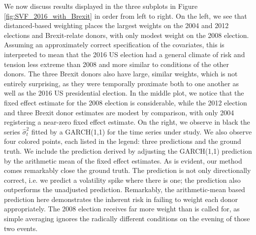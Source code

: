 \documentclass{uiucthesis2021}
\theoremstyle{definition}
\begin{document}
We now discuss results displayed in the three subplots in Figure \ref{fig:SVF_2016_with_Brexit} in order from left to right. On the left, we see that distanced-based weighting places the largest weights on the 2004 and 2012 elections and Brexit-relate donors, with only modest weight on the 2008 election. Assuming an approximately correct specification of the covariates, this is interpreted to mean that the 2016 US election had a general climate of risk and tension less extreme than 2008 and more similar to conditions of the other donors.  The three Brexit donors also have large, similar weights, which is not entirely surprising, as they were temporally proximate both to one another as well as the 2016 US presidential election.  In the middle plot, we notice that the fixed effect estimate for the 2008 election is considerable, while the 2012 election and three Brexit  donor estimates are modest by comparison, with only 2004 registering a near-zero fixed effect estimate. On the right, we observe in black the series $\hat\sigma^{2}_{t}$ fitted by a GARCH(1,1) for the time series under study.  We also observe four colored points, each listed in the legend: three predictions and the ground truth.  We include the prediction derived by adjusting the GARCH(1,1) prediction by the arithmetic mean of the fixed effect estimates.  As is evident, our method comes remarkably close the ground truth.  The prediction is not only directionally correct, i.e. we predict a volatility spike where there is one; the prediction also outperforms the unadjusted prediction.  Remarkably, the arithmetic-mean based prediction here demonstrates the inherent risk in failing to weight each donor appropriately.  The 2008 election receives far more weight than is called for, as simple averaging ignores the radically different conditions on the evening of those two events.  %
\end{document}
